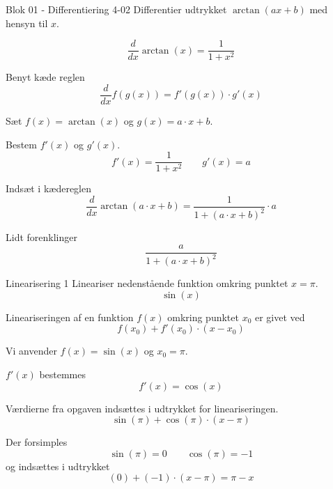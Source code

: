 \documentclass{article}
\begin{document}
\begin{exercise}{Blok 01 - Differentiering 4-02}
Differentier udtrykket $\arctan\left( a x + b \right)$ med hensyn til $x$.


\hint
\[
\frac{d}{dx} \arctan(x) = \frac{1}{1 + x^ 2}
\]


\hint
Benyt kæde reglen
\[
\frac{d}{dx} f(g(x)) = f'(g(x)) \cdot g'(x)
\]

\hint
Sæt $f(x) = \arctan(x)$ og $g(x) = a \cdot x + b$.

\hint
Bestem $f'(x)$ og $g'(x)$.
\[
f'(x) = \frac{1}{1 + x^ 2} \qquad g'(x) = a
\]

\hint
Indsæt i kædereglen
\[
\frac{d}{dx} \arctan\left( a \cdot x + b \right) = \frac{1}{1 + \left( a \cdot x + b \right)^2} \cdot a
\]

\hint
Lidt forenklinger
\[
\frac{a}{1 + \left( a \cdot x + b \right)^2}
\]
\end{exercise}


\begin{exercise}{Linearisering 1}
Lineariser nedenstående funktion omkring punktet $x = \pi$.
\[
\sin(x)
\]


\hint
Lineariseringen af en funktion $f(x)$
omkring punktet $x_0$ er givet ved
\[
f(x_0) + f'(x_0) \cdot (x - x_0)
\]

\hint
Vi anvender $f(x) = \sin(x)$ og $x_0 = \pi$.

\hint
$f'(x)$ bestemmes
\[
f'(x) = \cos(x)
\]

\hint
Værdierne fra opgaven indsættes i udtrykket for lineariseringen.
\[
\sin(\pi) + \cos(\pi) \cdot (x - \pi)
\]

\hint
Der forsimples
\[
\sin(\pi) = 0 \qquad
\cos(\pi) = -1
\]
og indsættes i udtrykket
\[
(0) + (-1) \cdot (x - \pi) =
\pi - x
\]

\end{exercise}
\end{document}
